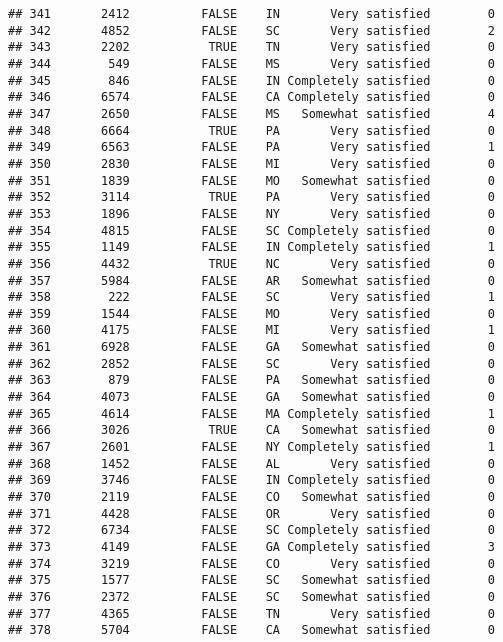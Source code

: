 \documentclass[]{book}
\theoremstyle{definition}
\theoremstyle{definition}
\theoremstyle{remark}
\begin{document}
\begin{verbatim}
## 341       2412          FALSE    IN       Very satisfied        0
## 342       4852          FALSE    SC       Very satisfied        2
## 343       2202           TRUE    TN       Very satisfied        0
## 344        549          FALSE    MS       Very satisfied        0
## 345        846          FALSE    IN Completely satisfied        0
## 346       6574          FALSE    CA Completely satisfied        0
## 347       2650          FALSE    MS   Somewhat satisfied        4
## 348       6664           TRUE    PA       Very satisfied        0
## 349       6563          FALSE    PA       Very satisfied        1
## 350       2830          FALSE    MI       Very satisfied        0
## 351       1839          FALSE    MO   Somewhat satisfied        0
## 352       3114           TRUE    PA       Very satisfied        0
## 353       1896          FALSE    NY       Very satisfied        0
## 354       4815          FALSE    SC Completely satisfied        0
## 355       1149          FALSE    IN Completely satisfied        1
## 356       4432           TRUE    NC       Very satisfied        0
## 357       5984          FALSE    AR   Somewhat satisfied        0
## 358        222          FALSE    SC       Very satisfied        1
## 359       1544          FALSE    MO       Very satisfied        0
## 360       4175          FALSE    MI       Very satisfied        1
## 361       6928          FALSE    GA   Somewhat satisfied        0
## 362       2852          FALSE    SC       Very satisfied        0
## 363        879          FALSE    PA   Somewhat satisfied        0
## 364       4073          FALSE    GA   Somewhat satisfied        0
## 365       4614          FALSE    MA Completely satisfied        1
## 366       3026           TRUE    CA   Somewhat satisfied        0
## 367       2601          FALSE    NY Completely satisfied        1
## 368       1452          FALSE    AL       Very satisfied        0
## 369       3746          FALSE    IN Completely satisfied        0
## 370       2119          FALSE    CO   Somewhat satisfied        0
## 371       4428          FALSE    OR       Very satisfied        0
## 372       6734          FALSE    SC Completely satisfied        0
## 373       4149          FALSE    GA Completely satisfied        3
## 374       3219          FALSE    CO       Very satisfied        0
## 375       1577          FALSE    SC   Somewhat satisfied        0
## 376       2372          FALSE    SC   Somewhat satisfied        0
## 377       4365          FALSE    TN       Very satisfied        0
## 378       5704          FALSE    CA   Somewhat satisfied        0

\end{verbatim}
\end{document}
